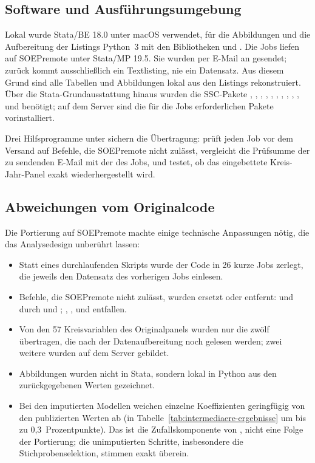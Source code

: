 \subsection{Software und Ausführungsumgebung}
\label{app:software}

Lokal wurde Stata/BE 18.0 unter macOS verwendet, für die Abbildungen und die Aufbereitung der Listings Python~3 mit den Bibliotheken  und . Die Jobs liefen auf SOEPremote unter Stata/MP 19.5. Sie wurden per E-Mail an  gesendet; zurück kommt ausschließlich ein Textlisting, nie ein Datensatz. Aus diesem Grund sind alle Tabellen und Abbildungen lokal aus den Listings rekonstruiert. Über die Stata-Grundausstattung hinaus wurden die SSC-Pakete , , , , , , , , , ,  und  benötigt; auf dem Server sind die für die Jobs erforderlichen Pakete vorinstalliert.

\begin{sloppypar}
Drei Hilfsprogramme unter  sichern die Übertragung:  prüft jeden Job vor dem Versand auf Befehle, die SOEPremote nicht zulässt,  vergleicht die Prüfsumme der zu sendenden E-Mail mit der des Jobs, und  testet, ob das eingebettete Kreis-Jahr-Panel exakt wiederhergestellt wird.
\end{sloppypar}

\subsection{Abweichungen vom Originalcode}
\label{app:abweichungen}

Die Portierung auf SOEPremote machte einige technische Anpassungen nötig, die das Analysedesign unberührt lassen:
\begin{itemize}
  \item Statt eines durchlaufenden Skripts wurde der Code in 26 kurze Jobs zerlegt, die jeweils den Datensatz des vorherigen Jobs einlesen.
  \item Befehle, die SOEPremote nicht zulässt, wurden ersetzt oder entfernt:  und  durch  und ; , ,  und  entfallen.
  \item Von den 57 Kreisvariablen des Originalpanels wurden nur die zwölf übertragen, die nach der Datenaufbereitung noch gelesen werden; zwei weitere wurden auf dem Server gebildet.
  \item Abbildungen wurden nicht in Stata, sondern lokal in Python aus den zurückgegebenen Werten gezeichnet.
  \item Bei den imputierten Modellen weichen einzelne Koeffizienten geringfügig von den publizierten Werten ab (in Tabelle~\ref{tab:intermediaere-ergebnisse} um bis zu 0,3~Prozentpunkte). Das ist die Zufallskomponente von , nicht eine Folge der Portierung; die unimputierten Schritte, insbesondere die Stichprobenselektion, stimmen exakt überein.
\end{itemize}

